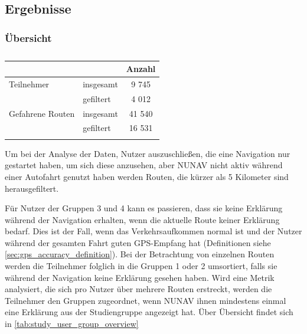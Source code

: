 \subsection{Ergebnisse}

\subsubsection{Übersicht}

\begin{longtable}{|l|l|c|}
    \hline
                        &           & \textbf{Anzahl} \\ \hline
    Teilnehmer          & insgesamt & 9 745 \\
                        & gefiltert & 4 012 \\ \hline
    Gefahrene Routen    & insgesamt & 41 540 \\
                        & gefiltert & 16 531 \\ \hline
\caption{}
\label{tab:study_user_overview}
\end{longtable}

Um bei der Analyse der Daten, Nutzer auszuschließen, die eine Navigation nur gestartet haben, um sich diese anzusehen, aber NUNAV nicht aktiv während einer Autofahrt genutzt haben werden Routen, die kürzer als 5 Kilometer sind herausgefiltert. 

Für Nutzer der Gruppen 3 und 4 kann es passieren, dass sie keine Erklärung während der Navigation erhalten, wenn die aktuelle Route keiner Erklärung bedarf. Dies ist der Fall, wenn das Verkehrsaufkommen \glqq normal\grqq{} ist und der Nutzer während der gesamten Fahrt guten GPS-Empfang hat (Definitionen siehe \autoref{sec:gps_accuracy_definition}). Bei der Betrachtung von einzelnen Routen werden die Teilnehmer folglich in die Gruppen 1 oder 2 umsortiert, falls sie während der Navigation keine Erklärung gesehen haben. Wird eine Metrik analysiert, die sich pro Nutzer über mehrere Routen erstreckt, werden die Teilnehmer den Gruppen zugeordnet, wenn NUNAV ihnen mindestens einmal eine Erklärung aus der Studiengruppe angezeigt hat. Über Übersicht findet sich in \autoref{tab:study_user_group_overview}

